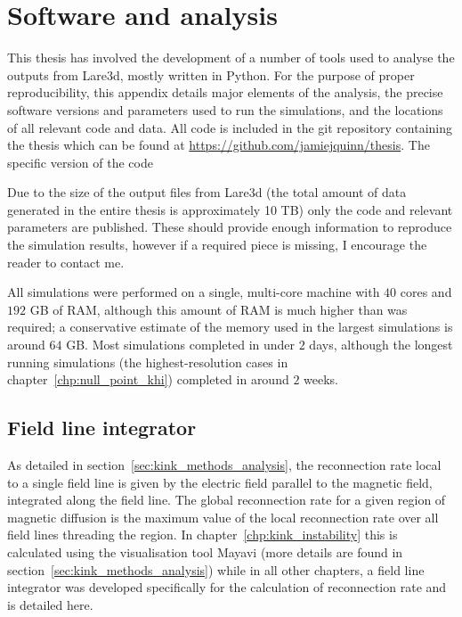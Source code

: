 \chapter{Software and analysis}

This thesis has involved the development of a number of tools used to analyse the outputs from Lare3d, mostly written in Python. For the purpose of proper reproducibility, this appendix details major elements of the analysis, the precise software versions and parameters used to run the simulations, and the locations of all relevant code and data. All code is included in the git repository containing the thesis which can be found at \url{https://github.com/jamiejquinn/thesis}. The specific version of the code 

Due to the size of the output files from Lare3d (the total amount of data generated in the entire thesis is approximately 10 TB) only the code and relevant parameters are published. These should provide enough information to reproduce the simulation results, however if a required piece is missing, I encourage the reader to contact me.

All simulations were performed on a single, multi-core machine with $40$ cores and $192$ GB of RAM, although this amount of RAM is much higher than was required; a conservative estimate of the memory used in the largest simulations is around $64$ GB. Most simulations completed in under $2$ days, although the longest running simulations (the highest-resolution cases in chapter~\ref{chp:null_point_khi}) completed in around $2$ weeks. 

\section{Field line integrator}

As detailed in section~\ref{sec:kink_methods_analysis}, the reconnection rate local to a single field line is given by the electric field parallel to the magnetic field, integrated along the field line. The global reconnection rate for a given region of magnetic diffusion is the maximum value of the local reconnection rate over all field lines threading the region. In chapter~\ref{chp:kink_instability} this is calculated using the visualisation tool Mayavi (more details are found in section~\ref{sec:kink_methods_analysis}) while in all other chapters, a field line integrator was developed specifically for the calculation of reconnection rate and is detailed here.

